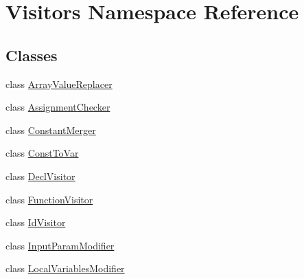 \hypertarget{namespaceVisitors}{}\section{Visitors Namespace Reference}
\label{namespaceVisitors}
\subsection*{Classes}
\begin{DoxyCompactItemize}
\item 
class \hyperlink{classVisitors_1_1ArrayValueReplacer}{Array\+Value\+Replacer}
\item 
class \hyperlink{classVisitors_1_1AssignmentChecker}{Assignment\+Checker}
\item 
class \hyperlink{classVisitors_1_1ConstantMerger}{Constant\+Merger}
\item 
class \hyperlink{classVisitors_1_1ConstToVar}{Const\+To\+Var}
\item 
class \hyperlink{classVisitors_1_1DeclVisitor}{Decl\+Visitor}
\item 
class \hyperlink{classVisitors_1_1FunctionVisitor}{Function\+Visitor}
\item 
class \hyperlink{classVisitors_1_1IdVisitor}{Id\+Visitor}
\item 
class \hyperlink{classVisitors_1_1InputParamModifier}{Input\+Param\+Modifier}
\item 
class \hyperlink{classVisitors_1_1LocalVariablesModifier}{Local\+Variables\+Modifier}
\end{DoxyCompactItemize}

